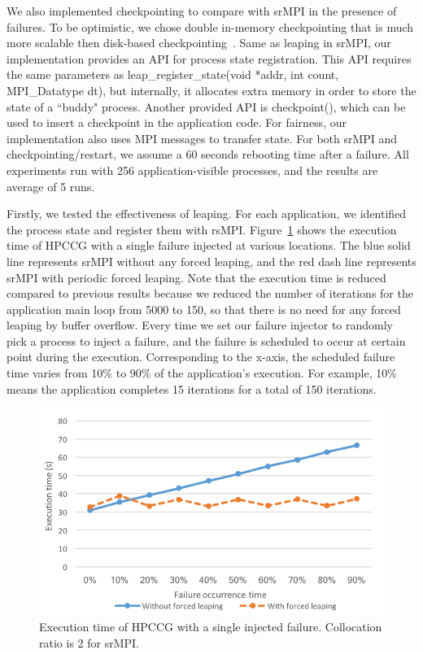 We also implemented checkpointing to compare with srMPI in the presence of failures. To be optimistic, we chose double in-memory checkpointing that is much more scalable then disk-based checkpointing~\cite{zheng2004ftc}. Same as leaping in srMPI, our implementation provides an API for process state registration. This API requires the same parameters as leap\_register\_state(void *addr, int count, MPI\_Datatype dt), but internally, it allocates extra memory in order to store the state of a ``buddy" process. Another provided API is checkpoint(), which can be used to insert a checkpoint in the application code. For fairness, our implementation also uses MPI messages to transfer state.  
For both srMPI and checkpointing/restart, we assume a 60 seconds rebooting time after a failure. All experiments run with 256 application-visible processes, and the results are average of 5 runs. 

Firstly, we tested the effectiveness of leaping. For each application, we identified the process state and register them with rsMPI. Figure~\ref{fig:single_failure} shows the execution time of HPCCG with a single failure injected at various locations. The blue solid line represents srMPI without any forced leaping, and the red dash line represents srMPI with periodic forced leaping. Note that the execution time is reduced compared to previous results because we reduced the number of iterations for the application main loop from 5000 to 150, so that there is no need for any forced leaping by buffer overflow. Every time we set our failure injector to randomly pick a process to inject a failure, and the failure is scheduled to occur at certain point during the execution. Corresponding to the x-axis, the scheduled failure time varies from 10\% to 90\% of the application's execution. For example, 10\% means the application completes 15 iterations for a total of 150 iterations. 

\begin{figure}[!t]
  \begin{center}
      \includegraphics[width=\columnwidth]{figures/single_failure}
  \end{center}
  \caption{Execution time of HPCCG with a single injected failure. Collocation ratio is 2 for srMPI.}
  \label{fig:single_failure}
\end{figure}


